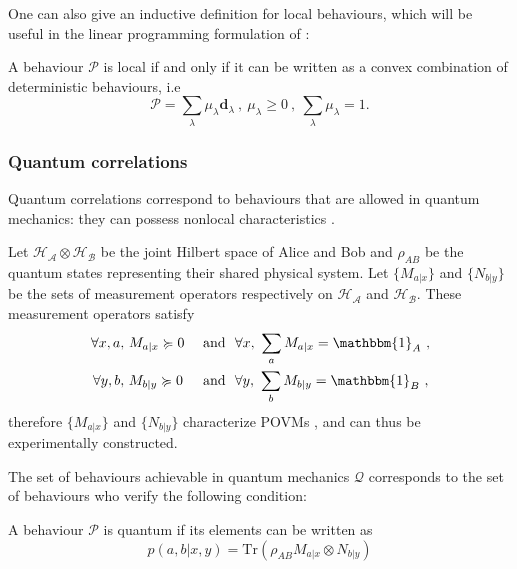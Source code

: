 One can also give an inductive definition for local behaviours, which will be useful in the linear programming formulation of :

\begin{proposition} \label{convex_sum} A behaviour
$\mathcal{P}$ is local if and only if it can be written as a convex combination
of deterministic behaviours, i.e \begin{equation}
    \mathcal{P} = \sum_\lambda \mu_\lambda \mathbf{d}_\lambda \ , \ \mu_\lambda
    \geq 0 \ , \ \sum_\lambda \mu_\lambda = 1 \text{.}
\end{equation} \end{proposition}


\subsubsection{Quantum correlations}

Quantum correlations correspond to behaviours that are allowed in quantum mechanics: they can possess nonlocal characteristics \cite{bell-viol-self-test}.


Let $\mathcal{H_A} \otimes \mathcal{H_B}$ be the joint Hilbert space of Alice
and Bob and $\rho_{AB}$ be the quantum states representing their shared physical
system. Let $\{M_{a|x}\}$ and $\{N_{b|y}\}$ be the sets of measurement operators
respectively on $\mathcal{H_A}$ and $\mathcal{H_B}$. These measurement operators satisfy
\begin{equation*}
\begin{aligned}
       \forall x,a,\ & M_{a|x} \succcurlyeq 0 & \text{ and } \ 
            & \forall x ,\ \sum_a  M_{a|x} = \mathbbm{1}_A \ , \\
       \forall y,b,\ & M_{b|y} \succcurlyeq 0 & \text{ and } \ 
            & \forall y ,\ \sum_b  M_{b|y} = \mathbbm{1}_B \ ,\\
\end{aligned}
\end{equation*}
therefore $\{M_{a|x}\}$ and $\{N_{b|y}\}$  characterize POVMs \cite{nielsen_quantum_2010}, and can thus be experimentally constructed.

The set of behaviours achievable in quantum mechanics $\mathcal{Q}$ corresponds to the set of behaviours who verify the following condition:

\begin{definition}[Quantum correlations] \label{eq:quant-correlation}

A behaviour $\mathcal{P}$ is quantum if
its elements can be written as 
\begin{equation}
    p(a,b|x,y) = \textrm{Tr}\left(  \rho_{AB}  M_{a|x} \otimes N_{b|y}\right)
\end{equation} 
\end{definition}

